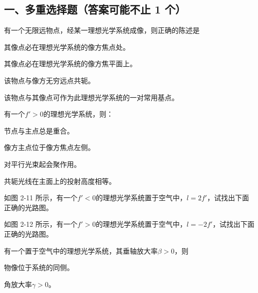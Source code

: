 \documentclass[standard, analysis, notocnum]{ExBook}
\newcommand{\answerarea}[1][8cm]{%
  \par\vspace{2mm}%
  \noindent{\color{themeColor!35}\rule{\linewidth}{0.4pt}}\par
  \noindent\begin{minipage}[t][#1][t]{\linewidth}\vspace{0pt}\end{minipage}\par
  \noindent{\color{themeColor!35}\rule{\linewidth}{0.4pt}}\par
}
\begin{document}
\subsection{一、多重选择题（答案可能不止 1 个）}
\begin{qitems}
\begin{bbox}
\qitem 有一个无限远物点，经某一理想光学系统成像，则正确的陈述是
\par\noindent\hspace{2em}其像点必在理想光学系统的像方焦点处。
\par\noindent\hspace{2em}其像点必在理想光学系统的像方焦平面上。
\par\noindent\hspace{2em}该物点与像方无穷远点共轭。
\par\noindent\hspace{2em}该物点与其像点可作为此理想光学系统的一对常用基点。
\answerarea[3.5cm]
\end{bbox}
\begin{bbox}
\qitem 有一个$f'>0$的理想光学系统，则：
\par\noindent\hspace{2em}节点与主点总是重合。
\par\noindent\hspace{2em}像方主点位于像方焦点左侧。
\par\noindent\hspace{2em}对平行光束起会聚作用。
\par\noindent\hspace{2em}共轭光线在主面上的投射高度相等。
\answerarea[3.5cm]
\end{bbox}
\begin{bbox}
\qitem 如图 2-11 所示，有一个$f'<0$的理想光学系统置于空气中，$l=2f'$，试找出下面正确的光路图。
\answerarea[3.5cm]
\end{bbox}
\begin{bbox}
\qitem 如图 2-12 所示，有一个$f'>0$的理想光学系统置于空气中，$l=-2f'$，试找出下面正确的光路图。
\answerarea[3.5cm]
\end{bbox}
\begin{bbox}
\qitem 有一个置于空气中的理想光学系统，其垂轴放大率$\beta >0$，则
\par\noindent\hspace{2em}物像位于系统的同侧。
\par\noindent\hspace{2em}角放大率$\gamma >0$。

\end{bbox}
\end{qitems}
\end{document}
